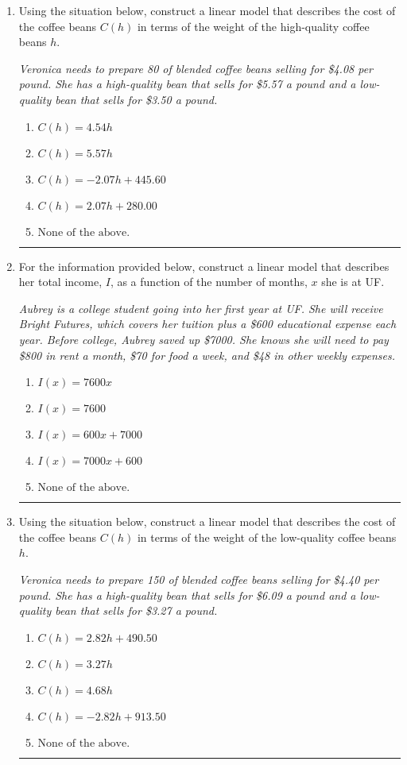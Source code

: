 \documentclass[14pt]{extbook}
\newcommand{\litem}[1]{\item#1\hspace*{-1cm}\rule{\textwidth}{0.4pt}}
\begin{document}
\begin{enumerate}
{\begin{enumerate}[label=\Alph*.]
\end{enumerate} }
\litem{
Using the situation below, construct a linear model that describes the cost of the coffee beans $C(h)$ in terms of the weight of the high-quality coffee beans $h$.
\begin{center}
    \textit{ Veronica needs to prepare 80 of blended coffee beans selling for \$4.08 per pound. She has a high-quality bean that sells for \$5.57 a pound and a low-quality bean that sells for \$3.50 a pound. }
\end{center}
\begin{enumerate}[label=\Alph*.]
\item \( C(h) = 4.54 h \)
\item \( C(h) = 5.57 h \)
\item \( C(h) = -2.07 h + 445.60 \)
\item \( C(h) = 2.07 h + 280.00 \)
\item \( \text{None of the above.} \)

\end{enumerate} }
\litem{
For the information provided below, construct a linear model that describes her total income, $I$, as a function of the number of months, $x$ she is at UF.
\begin{center}
    \textit{ Aubrey is a college student going into her first year at UF. She will receive Bright Futures, which covers her tuition plus a \$600 educational expense each year. Before college, Aubrey saved up \$7000. She knows she will need to pay \$800 in rent a month, \$70 for food a week, and \$48 in other weekly expenses. }
\end{center}
\begin{enumerate}[label=\Alph*.]
\item \( I(x) = 7600 x \)
\item \( I(x) = 7600 \)
\item \( I(x) = 600 x + 7000 \)
\item \( I(x) = 7000 x + 600 \)
\item \( \text{None of the above.} \)

\end{enumerate} }
\litem{
Using the situation below, construct a linear model that describes the cost of the coffee beans $C(h)$ in terms of the weight of the low-quality coffee beans $h$.
\begin{center}
    \textit{ Veronica needs to prepare 150 of blended coffee beans selling for \$4.40 per pound. She has a high-quality bean that sells for \$6.09 a pound and a low-quality bean that sells for \$3.27 a pound. }
\end{center}
\begin{enumerate}[label=\Alph*.]
\item \( C(h) = 2.82 h + 490.50 \)
\item \( C(h) = 3.27 h \)
\item \( C(h) = 4.68 h \)
\item \( C(h) = -2.82 h + 913.50 \)
\item \( \text{None of the above.} \)


\end{enumerate}}
\end{enumerate}
\end{document}
